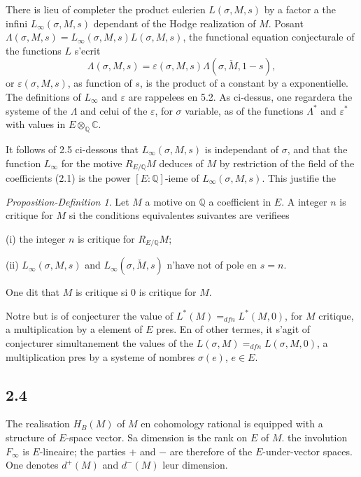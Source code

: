 \documentclass[12pt,a4paper]{article}
\theoremstyle{plain}
\theoremstyle{definition}
\theoremstyle{remark}
\newtheorem{proposition-definition}[theorem]{Proposition-Definition}
\newcommand{\Q}{\mathbb{Q}}
\newcommand{\C}{\mathbb{C}}
\begin{document}
There is lieu of completer the product eulerien $L(\sigma, M, s)$ by a factor a the infini
$L_\infty(\sigma, M, s)$ dependant of the Hodge realization of $M$. Posant
$\Lambda(\sigma, M, s) = L_\infty(\sigma, M, s) L(\sigma, M, s)$, the functional equation conjecturale
of the functions $L$ s'ecrit
\begin{equation}\label{eq:2.2.3}
\Lambda(\sigma, M, s) = \varepsilon(\sigma, M, s) \Lambda(\sigma, \check{M}, 1-s),
\end{equation}
or $\varepsilon(\sigma, M, s)$, as function of $s$, is the product of a constant by a exponentielle.
The definitions of $L_\infty$ and $\varepsilon$ are rappelees en 5.2. As ci-dessus, one regardera the
systeme of the $\Lambda$ and celui of the $\varepsilon$, for $\sigma$ variable, as of the functions
$\Lambda^*$ and $\varepsilon^*$ with values in $E \otimes_\Q \C$.

It follows of 2.5 ci-dessous that $L_\infty(\sigma, M, s)$ is independant of $\sigma$, and that the function
$L_\infty$ for the motive $R_{E/\Q} M$ deduces of $M$ by restriction of the field of the coefficients
(2.1) is the power $[E:\Q]$-ieme of $L_\infty(\sigma, M, s)$. This justifie the

\begin{proposition-definition}\label{prop:2.3}
Let $M$ a motive on $\Q$ a coefficient in $E$. A integer $n$ is critique for $M$ si the
conditions equivalentes suivantes are verifiees

\textup{(i)} the integer $n$ is critique for $R_{E/\Q} M$;

\textup{(ii)} $L_\infty(\sigma, M, s)$ and $L_\infty(\sigma, \check{M}, s)$ n'have not of pole en $s = n$.

One dit that $M$ is critique si $0$ is critique for $M$.
\end{proposition-definition}

Notre but is of conjecturer the value of $L^*(M) =_{dfn} L^*(M, 0)$, for $M$ critique,
a multiplication by a element of $E$ pres. En of other termes, it s'agit of conjecturer
simultanement the values of the $L(\sigma, M) =_{dfn} L(\sigma, M, 0)$, a multiplication pres by
a systeme of nombres $\sigma(e)$, $e \in E$.

\subsection*{2.4}

The realisation $H_B(M)$ of $M$ en cohomology rational is equipped with a structure
of $E$-space vector. Sa dimension is the rank on $E$ of $M$. the involution $F_\infty$
is $E$-lineaire; the parties $+$ and $-$ are therefore of the $E$-under-vector spaces. One denotes
$d^+(M)$ and $d^-(M)$ leur dimension.
\end{document}
